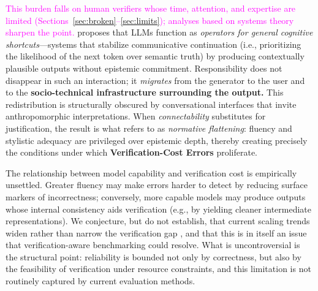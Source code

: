 \documentclass[11pt]{article}
\newcommand{\rev}[1]{\textcolor{magenta}{#1}}
\newcommand{\viola}[1]{\textcolor[HTML]{7030A0}{#1}}
\newcommand{\rev}[1]{#1}
\newcommand{\viola}[1]{#1}
\begin{document}
\rev{This burden falls on human verifiers whose time, attention, and expertise are limited (Sections~\ref{sec:broken}--\ref{sec:limits}); analyses based on systems theory sharpen the point.}
\cite{sariyar2026gecos} proposes that LLMs function as \textit{operators for general cognitive shortcuts}---systems that stabilize communicative continuation (i.e., prioritizing the likelihood of the next token over semantic truth) by producing contextually plausible outputs without epistemic commitment. Responsibility does not disappear in such an interaction; it \textit{migrates} from the generator to the user and to the \textbf{socio-technical infrastructure surrounding the output.} This redistribution is structurally obscured by conversational interfaces that invite anthropomorphic interpretations. When \textit{connectability} substitutes for justification, the result is what \cite{sariyar2026gecos} {refers to as} \textit{normative flattening}: fluency and stylistic adequacy are privileged over epistemic depth, thereby creating precisely the conditions under which \textbf{Verification-Cost Errors} proliferate.

{The relationship between model capability and verification cost is empirically unsettled. Greater fluency may make errors harder to detect by reducing surface markers of incorrectness; conversely, more capable models may produce outputs whose internal consistency aids verification (e.g., by yielding cleaner intermediate representations). We conjecture, but do not establish, that current scaling trends widen rather than narrow the verification gap \citep{wei2022emergent, bubeck2023sparks}, and that this is in itself an issue that verification-aware benchmarking could resolve. What is uncontroversial is the structural point: reliability is bounded not only by correctness, but also by the feasibility of verification under resource constraints,} \viola{and this limitation is not routinely captured by current evaluation methods.}
\end{document}
